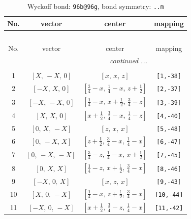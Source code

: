 \documentclass[fleqn,8pt]{jsarticle}
\begin{document}
\begin{longtable}{cccc}
\caption{Wyckoff bond: {\tt 96b@96g}, bond symmetry: {\tt ..m}}
 \\
 \hline \hline
No. & vector & center & mapping \\ \hline \endfirsthead

\multicolumn{3}{l}{\tablename\ \thetable{}} \\
 \hline \hline
No. & vector & center & mapping \\ \hline \endhead

 \hline \hline
\multicolumn{3}{r}{\footnotesize\it continued ...} \\ \endfoot

 \hline \hline
\multicolumn{3}{r}{} \\ \endlastfoot

1 & $\left[ X,\, - X,\, 0 \right]$ & $\left[ x,\, x,\, z \right]$ & {\tt [1,-38]} \\ \hline
2 & $\left[ - X,\, X,\, 0 \right]$ & $\left[ \frac{3}{4} - x,\, \frac{1}{4} - x,\, z + \frac{1}{2} \right]$ & {\tt [2,-37]} \\ \hline
3 & $\left[ - X,\, - X,\, 0 \right]$ & $\left[ \frac{1}{4} - x,\, x + \frac{1}{2},\, \frac{3}{4} - z \right]$ & {\tt [3,-39]} \\ \hline
4 & $\left[ X,\, X,\, 0 \right]$ & $\left[ x + \frac{1}{2},\, \frac{3}{4} - x,\, \frac{1}{4} - z \right]$ & {\tt [4,-40]} \\ \hline
5 & $\left[ 0,\, X,\, - X \right]$ & $\left[ z,\, x,\, x \right]$ & {\tt [5,-48]} \\ \hline
6 & $\left[ 0,\, - X,\, X \right]$ & $\left[ z + \frac{1}{2},\, \frac{3}{4} - x,\, \frac{1}{4} - x \right]$ & {\tt [6,-47]} \\ \hline
7 & $\left[ 0,\, - X,\, - X \right]$ & $\left[ \frac{3}{4} - z,\, \frac{1}{4} - x,\, x + \frac{1}{2} \right]$ & {\tt [7,-45]} \\ \hline
8 & $\left[ 0,\, X,\, X \right]$ & $\left[ \frac{1}{4} - z,\, x + \frac{1}{2},\, \frac{3}{4} - x \right]$ & {\tt [8,-46]} \\ \hline
9 & $\left[ - X,\, 0,\, X \right]$ & $\left[ x,\, z,\, x \right]$ & {\tt [9,-43]} \\ \hline
10 & $\left[ X,\, 0,\, - X \right]$ & $\left[ \frac{1}{4} - x,\, z + \frac{1}{2},\, \frac{3}{4} - x \right]$ & {\tt [10,-44]} \\ \hline
11 & $\left[ - X,\, 0,\, - X \right]$ & $\left[ x + \frac{1}{2},\, \frac{3}{4} - z,\, \frac{1}{4} - x \right]$ & {\tt [11,-42]} \\ \hline

\end{longtable}
\end{document}

